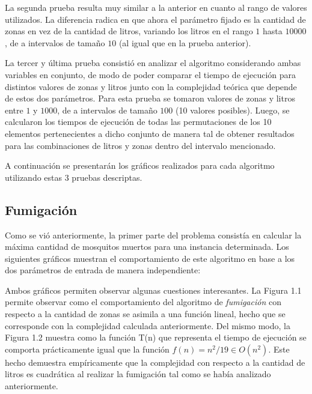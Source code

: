 \documentclass[a4paper,11pt] {article}
\begin{document}
La segunda prueba resulta muy similar a la anterior en cuanto al rango de valores utilizados. La diferencia radica en que ahora el par\'ametro fijado es la cantidad de zonas en vez de la cantidad de litros, variando los litros en el rango $1$ hasta $10000$, de a intervalos de tamaño $10$ (al igual que en la prueba anterior).

La tercer y \'ultima prueba consisti\'o en analizar el algoritmo considerando ambas variables en conjunto, de modo de poder comparar el tiempo de ejecuci\'on para distintos valores de zonas y litros junto con la complejidad te\'orica que depende de estos dos par\'ametros. Para esta prueba se tomaron valores de zonas y litros entre $1$ y $1000$, de a intervalos de tamaño $100$ (10 valores posibles). Luego, se calcularon los tiempos de ejecuci\'on de todas las permutaciones de los 10 elementos pertenecientes a dicho conjunto de manera tal de obtener resultados para las combinaciones de litros y zonas dentro del intervalo mencionado.

A continuaci\'on se presentar\'an los gr\'aficos realizados para cada algoritmo utilizando estas 3 pruebas descriptas.

\subsection*{Fumigaci\'on}

Como se vi\'o anteriormente, la primer parte del problema consist\'ia en calcular la m\'axima cantidad de mosquitos muertos para una instancia determinada. Los siguientes gr\'aficos muestran el comportamiento de este algoritmo en base a los dos par\'ametros de entrada de manera independiente:


Ambos gr\'aficos permiten observar algunas cuestiones interesantes. La Figura 1.1 permite observar como el comportamiento del algoritmo de \textit{fumigaci\'on} con respecto a la cantidad de zonas se asimila a una funci\'on lineal, hecho que se corresponde con la complejidad calculada anteriormente. Del mismo modo, la Figura 1.2 muestra como la funci\'on T(n) que representa el tiempo de ejecuci\'on se comporta pr\'acticamente igual que la funci\'on $f(n) = n^2/19 \in O(n^2)$. Este hecho demuestra emp\'iricamente que la complejidad con respecto a la cantidad de litros es cuadr\'atica al realizar la fumigaci\'on tal como se hab\'ia analizado anteriormente.
\end{document}
